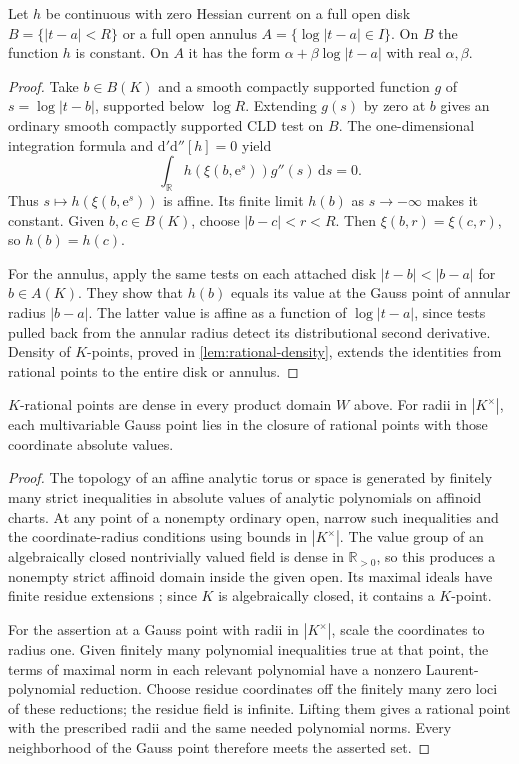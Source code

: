 \documentclass[11pt,a4paper]{amsart}
\begin{document}
\begin{lemma}\label{lem:curve-rigidity}
Let $h$ be continuous with zero Hessian current on a full open disk $B=\{|t-a|<R\}$ or a full open annulus $A=\{\log|t-a|\in I\}$. On $B$ the function $h$ is constant. On $A$ it has the form $\alpha+\beta\log|t-a|$ with real $\alpha,\beta$.
\end{lemma}

\begin{proof}
Take $b\in B(K)$ and a smooth compactly supported function $g$ of $s=\log|t-b|$, supported below $\log R$. Extending $g(s)$ by zero at $b$ gives an ordinary smooth compactly supported CLD test on $B$. The one-dimensional integration formula and $\mathrm d'\mathrm d''[h]=0$ yield
\[
 \int_{\mathbb R}h(\xi(b,\mathrm e^s))g''(s)\,\mathrm ds=0.
\]
Thus $s\mapsto h(\xi(b,\mathrm e^s))$ is affine. Its finite limit $h(b)$ as $s\to-\infty$ makes it constant. Given $b,c\in B(K)$, choose $|b-c|<r<R$. Then $\xi(b,r)=\xi(c,r)$, so $h(b)=h(c)$.

For the annulus, apply the same tests on each attached disk $|t-b|<|b-a|$ for $b\in A(K)$. They show that $h(b)$ equals its value at the Gauss point of annular radius $|b-a|$. The latter value is affine as a function of $\log|t-a|$, since tests pulled back from the annular radius detect its distributional second derivative. Density of $K$-points, proved in \cref{lem:rational-density}, extends the identities from rational points to the entire disk or annulus.
\end{proof}

\begin{lemma}\label{lem:rational-density}
$K$-rational points are dense in every product domain $W$ above. For radii in $|K^\times|$, each multivariable Gauss point lies in the closure of rational points with those coordinate absolute values.
\end{lemma}

\begin{proof}
The topology of an affine analytic torus or space is generated by finitely many strict inequalities in absolute values of analytic polynomials on affinoid charts. At any point of a nonempty ordinary open, narrow such inequalities and the coordinate-radius conditions using bounds in $|K^\times|$. The value group of an algebraically closed nontrivially valued field is dense in $\mathbb R_{>0}$, so this produces a nonempty strict affinoid domain inside the given open. Its maximal ideals have finite residue extensions \cite[Theorem~5.19]{JonssonHorawa20}; since $K$ is algebraically closed, it contains a $K$-point.

For the assertion at a Gauss point with radii in $|K^\times|$, scale the coordinates to radius one. Given finitely many polynomial inequalities true at that point, the terms of maximal norm in each relevant polynomial have a nonzero Laurent-polynomial reduction. Choose residue coordinates off the finitely many zero loci of these reductions; the residue field is infinite. Lifting them gives a rational point with the prescribed radii and the same needed polynomial norms. Every neighborhood of the Gauss point therefore meets the asserted set.
\end{proof}
\end{document}
